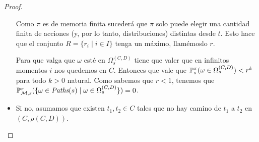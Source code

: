 \begin{proof}
\begin{itemize}
		      Como $\pi$ es de memoria finita sucederá que $\pi$ solo puede elegir una
		      cantidad finita de acciones (y, por lo tanto, distribuciones) distintas desde
		      $t$. Esto hace que el conjunto $R = \{r_i \mid i \in I\}$ tenga un máximo,
		      llamémoslo $r$.

		      Para que valga que $\omega$ esté en $\Omega_s^{(C,D)}$ tiene que valer que en
		      infinitos momentos $i$ nos quedemos en $C$. Entonces que vale que $\mathbb{P}_s^\pi
			      (\omega \in \Omega_s^{(C,D)}) < r^k$ para todo $k > 0$ natural. Como sabemos
		      que $r < 1$, tenemos que $\mathbb{P}^\pi_{\mathcal{M}, s}(\{ \omega \in \textit{Paths}(s) \mid \omega
			      \in \Omega_s^{(C,D)}\}) = 0$.








		\item Si no, asumamos que existen $t_1, t_2 \in C$ tales que no hay camino de $t_1$ a
		      $t_2$ en $(C, \rho(C,D))$.


\end{itemize}
\end{proof}
